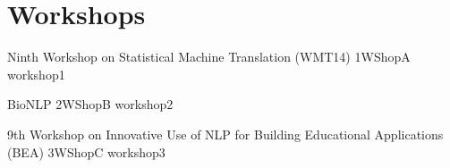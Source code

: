 \chapter[Workshops: Thursday--Friday, \daydate]{Workshops}
\thispagestyle{emptyheader}
\vfill



\clearpage
{}

\begin{wsschedule}
  {Ninth Workshop on Statistical Machine Translation (WMT14)}
  {1}{WShopA}
  {workshop1}
  {\WShopLocA}
  
\end{wsschedule}
        
\begin{wsschedule}
  {BioNLP}
  {2}{WShopB}
  {workshop2}
  {\WShopLocB}
  
\end{wsschedule}



\begin{wsschedule}
  {9th Workshop on Innovative Use of NLP for Building Educational Applications (BEA)}
  {3}{WShopC}
  {workshop3}
  {\WShopLocC}
  \clearpage
\end{wsschedule}

